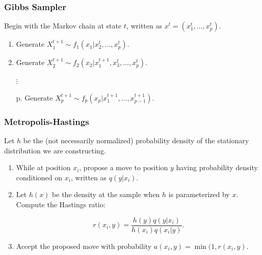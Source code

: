 \documentclass{beamer} %
\begin{document}

\begin{frame}

	\frametitle{Gibbs Sampler}
	

Begin with the Markov chain at state $t$, written as $x^t = (x_1^t,\dotso,x_p^t)$. 

\begin{enumerate}

\item Generate $X_1^{t+1} \sim f_1(x_1 | x_2^t,\dotso,x_p^t)$.
\item Generate $X_2^{t+1} \sim f_2(x_2 | x_1^{t+1},x_3^t,\dotso,x_p^t)$.

$\vdots$

\item [p.] Generate $X_p^{t+1} \sim f_p(x_p|x_1^{t+1},\dotso,x_{p-1}^{t+1})$.

\end{enumerate}

\end{frame}


\begin{frame}

\frametitle{Metropolis-Hastings}

Let $h$ be the (not necessarily normalized) probability density of the stationary distribution we are constructing. 
\begin{enumerate}
\item While at position $x_i$, propose a move to position $y$ having probability density conditioned on $x_i$, written as $q(y | x_i)$.
\item Let $h(x)$ be the density at the sample when $h$ is parameterized by $x$. Compute the Hastings ratio:

\[
r(x_i,y) = \frac{h(y) q(y | x_i)} {h(x_i) q(x_i | y)}.
\]

\item Accept the proposed move with probability $a(x_i, y) = \min(1, r(x_i, y)$. 
\end{enumerate}

\end{frame}


\end{document}
